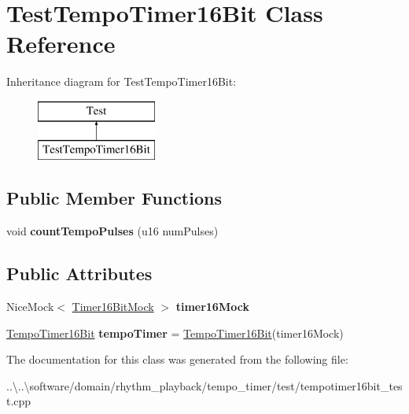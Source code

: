 \hypertarget{class_test_tempo_timer16_bit}{}\section{Test\+Tempo\+Timer16\+Bit Class Reference}
\label{class_test_tempo_timer16_bit}
Inheritance diagram for Test\+Tempo\+Timer16\+Bit\+:\begin{figure}[H]
\begin{center}
\leavevmode
\includegraphics[height=2.000000cm]{class_test_tempo_timer16_bit}
\end{center}
\end{figure}
\subsection*{Public Member Functions}
\begin{DoxyCompactItemize}
\item 
\mbox{\label{class_test_tempo_timer16_bit_a0686c53579db8bafbc86afb8159254de}} 
void {\bfseries count\+Tempo\+Pulses} (u16 num\+Pulses)
\end{DoxyCompactItemize}
\subsection*{Public Attributes}
\begin{DoxyCompactItemize}
\item 
\mbox{\label{class_test_tempo_timer16_bit_aa260c814720ac243dae4f16949730bea}} 
Nice\+Mock$<$ \mbox{\hyperlink{class_timer16_bit_mock}{Timer16\+Bit\+Mock}} $>$ {\bfseries timer16\+Mock}
\item 
\mbox{\label{class_test_tempo_timer16_bit_ab636f3982d6a96505efd66385f111814}} 
\mbox{\hyperlink{class_tempo_timer16_bit}{Tempo\+Timer16\+Bit}} {\bfseries tempo\+Timer} = \mbox{\hyperlink{class_tempo_timer16_bit}{Tempo\+Timer16\+Bit}}(timer16\+Mock)
\end{DoxyCompactItemize}


The documentation for this class was generated from the following file\+:\begin{DoxyCompactItemize}
\item 
..\textbackslash{}..\textbackslash{}software/domain/rhythm\+\_\+playback/tempo\+\_\+timer/test/tempotimer16bit\+\_\+test.\+cpp\end{DoxyCompactItemize}
